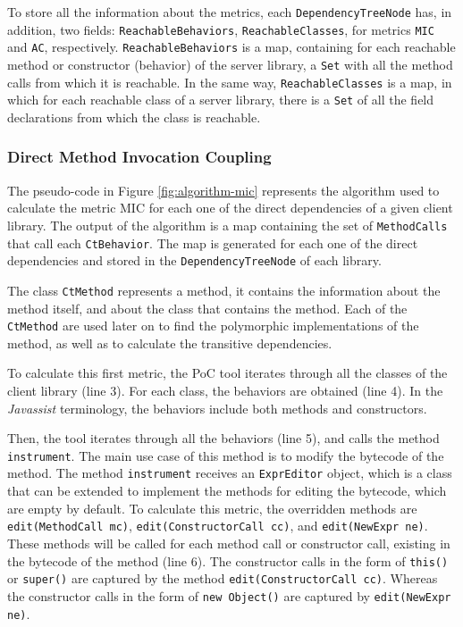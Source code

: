 To store all the information about the metrics, each \texttt{DependencyTreeNode} has, in addition, two fields: \texttt{ReachableBehaviors}, \texttt{ReachableClasses}, for metrics \texttt{MIC} and \texttt{AC}, respectively. \texttt{ReachableBehaviors} is a map, containing for each reachable method or constructor (behavior) of the server library, a \texttt{Set} with all the method calls from which it is reachable. In the same way, \texttt{ReachableClasses} is a map, in which for each reachable class of a server library, there is a \texttt{Set} of all the field declarations from which the class is reachable.


\subsubsection{Direct Method Invocation Coupling}
The pseudo-code in Figure \ref{fig:algorithm-mic} represents the algorithm used to calculate the metric MIC for each one of the direct dependencies of a given client library. The output of the algorithm is a map containing the set of \texttt{MethodCalls} that call each \texttt{CtBehavior}. The map is generated for each one of the direct dependencies and stored in the \texttt{DependencyTreeNode} of each library.

The class \texttt{CtMethod} represents a method, it contains the information about the method itself, and about the class that contains the method. Each of the \texttt{CtMethod} are used later on to find the polymorphic implementations of the method, as well as to calculate the transitive dependencies.

To calculate this first metric, the PoC tool iterates through all the classes of the client library (line 3). For each class, the behaviors are obtained (line 4). In the \textit{Javassist} terminology, the behaviors include both methods and constructors.

Then, the tool iterates through all the behaviors (line 5), and calls the method \texttt{instrument}. The main use case of this method is to modify the bytecode of the method. The method \texttt{instrument} receives an \texttt{ExprEditor} object, which is a class that can be extended to implement the methods for editing the bytecode, which are empty by default. To calculate this metric, the overridden methods are \texttt{edit(MethodCall mc)}, \texttt{edit(ConstructorCall cc)}, and \texttt{edit(NewExpr ne)}. These methods will be called for each method call or constructor call, existing in the bytecode of the method (line 6). The constructor calls in the form of \texttt{this()} or \texttt{super()} are captured by the method \texttt{edit(ConstructorCall cc)}. Whereas the constructor calls in the form of \texttt{new Object()} are captured by \texttt{edit(NewExpr ne)}.

